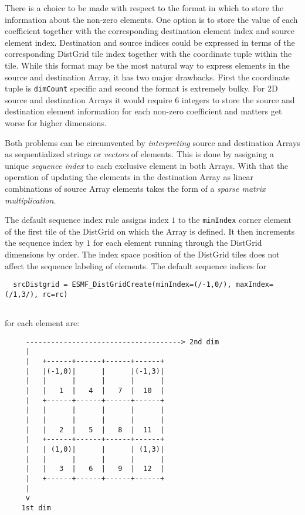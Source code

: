    There is a choice to be made with respect to the format in which to store the
   information about the non-zero elements. One option is to store the value
   of each coefficient together with the corresponding destination element index
   and source element index. Destination and source indices could be expressed in
   terms of the corresponding DistGrid tile index together with the coordinate
   tuple within the tile. While this format may be the most natural way to
   express elements in the source and destination Array, it has two major drawbacks.
   First the coordinate tuple is {\tt dimCount} specific and second the format
   is extremely bulky. For 2D source and destination Arrays it would require 6
   integers to store the source and destination element information for each
   non-zero coefficient and matters get worse for higher dimensions.
  
   Both problems can be circumvented by {\em interpreting} source and destination
   Arrays as sequentialized strings or {\em vectors} of elements. This is done
   by assigning a unique {\em sequence index} to each exclusive element in both
   Arrays. With that the operation of updating the elements in the destination Array
   as linear combinations of source Array elements takes the form of a {\em sparse
   matrix multiplication}.
  
   The default sequence index rule assigns index $1$ to the {\tt minIndex} corner
   element of the first tile of the DistGrid on which the Array is defined. It then
   increments the sequence index by $1$ for each element running through the
   DistGrid dimensions by order. The index space position of the DistGrid tiles
   does not affect the sequence labeling of elements. The default sequence indices
   for 

 \begin{verbatim}
  srcDistgrid = ESMF_DistGridCreate(minIndex=(/-1,0/), maxIndex=(/1,3/), rc=rc)
 
\end{verbatim}
 

   for each element are:
   \begin{verbatim}
     -------------------------------------> 2nd dim
     |
     |   +------+------+------+------+
     |   |(-1,0)|      |      |(-1,3)|
     |   |      |      |      |      |
     |   |   1  |   4  |   7  |  10  |
     |   +------+------+------+------+
     |   |      |      |      |      |
     |   |      |      |      |      |
     |   |   2  |   5  |   8  |  11  |
     |   +------+------+------+------+
     |   | (1,0)|      |      | (1,3)|
     |   |      |      |      |      |
     |   |   3  |   6  |   9  |  12  |
     |   +------+------+------+------+
     |
     v
    1st dim
   \end{verbatim}
  
